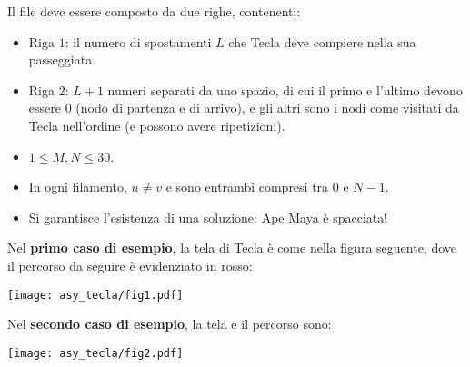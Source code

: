 \OutputFile
Il file \outputfile{} deve essere composto da due righe, contenenti:
\begin{itemize}[nolistsep,itemsep=2mm]
\item Riga $1$: il numero di spostamenti $L$ che Tecla deve compiere nella sua passeggiata.
\item Riga $2$: $L+1$ numeri separati da uno spazio, di cui il primo e l'ultimo devono essere $0$ (nodo di partenza e di arrivo), e gli altri sono i nodi come visitati da Tecla nell'ordine (e possono avere ripetizioni).
\end{itemize}
	


\Constraints

\begin{itemize}[nolistsep, itemsep=2mm]
    \item $ 1 \leq M, N \leq 30 $.
    \item In ogni filamento, $u \neq v$ e sono entrambi compresi tra $0$ e $N-1$.
    \item Si garantisce l'esistenza di una soluzione: Ape Maya \`e spacciata!
\end{itemize}



\Examples

\begin{example}
%
%
\end{example}



\Explanation

Nel \textbf{primo caso di esempio}, la tela di Tecla \`e come nella figura seguente, dove il percorso da seguire \`e evidenziato in rosso:
\begin{center}
	\texttt{[image: asy\_tecla/fig1.pdf]}
\end{center}

Nel \textbf{secondo caso di esempio}, la tela e il percorso sono:
\begin{center}
	\texttt{[image: asy\_tecla/fig2.pdf]}
\end{center}

